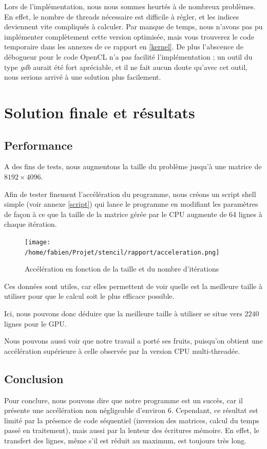 \documentclass{article}
\begin{document}
Lors de l'implémentation, nous nous sommes heurtés à de nombreux problèmes. En effet, le nombre de threads nécessaire est difficile à régler, et les indices deviennent vite compliqués à calculer.
Par manque de temps, nous n'avons pas pu implémenter complètement cette version optimisée, mais vous trouverez le code temporaire dans les annexes de ce rapport en \ref{kernel}.
De plus l'abscence de débogueur pour le code OpenCL n'a pas facilité l'implémentation ; un outil du type \textit{gdb} aurait été fort apréciable, et il ne fait aucun doute qu'avec cet outil, nous serions arrivé à une solution plus facilement.

\section{Solution finale et résultats}
\subsection{Performance}
A des fins de tests, nous augmentons la taille du problème jusqu'à une matrice de $8192\times4096$.

Afin de tester finement l'accélération du programme, nous créons un script shell simple (voir annexe \ref{script}) qui lance le programme en modifiant les paramètres de façon à ce que la taille de la matrice gérée par le CPU augmente de 64 lignes à chaque itération.

\begin{figure}[htp]
\texttt{[image: /home/fabien/Projet/stencil/rapport/acceleration.png]}
\caption{Accélération en fonction de la taille et du nombre d'itérations}
\label{acceleration}
\end{figure}

Ces données sont utiles, car elles permettent de voir quelle est la meilleure taille à utiliser pour que le calcul soit le plus efficace possible.

Ici, nous pouvons donc déduire que la meilleure taille à utiliser se situe vers $2240$ lignes pour le GPU.

Nous pouvons aussi voir que notre travail a porté ses fruits, puisqu'on obtient une accélération supérieure à celle observée par la version CPU multi-threadée.

\subsection{Conclusion}
Pour conclure, nous pouvons dire que notre programme est un succès, car il présente une accélération non négligeable d'environ 6. 
Cependant, ce résultat est limité par la présence de code séquentiel (inversion des matrices, calcul du temps passé en traitement), mais aussi par la lenteur des écritures mémoire. En effet, le transfert des lignes, même s'il est réduit au maximum, est toujours très long.
\end{document}
